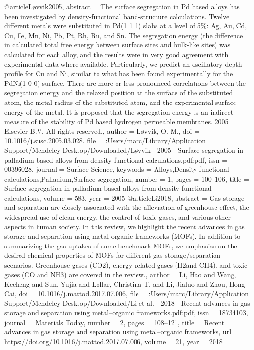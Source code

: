 @article{Løvvik2005,
abstract = {The surface segregation in Pd based alloys has been investigated by density-functional band-structure calculations. Twelve different metals were substituted in Pd(1 1 1) slabs at a level of 5{\%}: Ag, Au, Cd, Cu, Fe, Mn, Ni, Pb, Pt, Rh, Ru, and Sn. The segregation energy (the difference in calculated total free energy between surface sites and bulk-like sites) was calculated for each alloy, and the results were in very good agreement with experimental data where available. Particularly, we predict an oscillatory depth profile for Cu and Ni, similar to what has been found experimentally for the PdNi(1 0 0) surface. There are more or less pronounced correlations between the segregation energy and the relaxed position at the surface of the substituted atom, the metal radius of the substituted atom, and the experimental surface energy of the metal. It is proposed that the segregation energy is an indirect measure of the stability of Pd based hydrogen permeable membranes. {\textcopyright} 2005 Elsevier B.V. All rights reserved.},
author = {L{\o}vvik, O. M.},
doi = {10.1016/j.susc.2005.03.028},
file = {:Users/marc/Library/Application Support/Mendeley Desktop/Downloaded/L{\o}vvik - 2005 - Surface segregation in palladium based alloys from density-functional calculations.pdf:pdf},
issn = {00396028},
journal = {Surface Science},
keywords = {Alloys,Density functional calculations,Palladium,Surface segregation},
number = {1},
pages = {100--106},
title = {{Surface segregation in palladium based alloys from density-functional calculations}},
volume = {583},
year = {2005}
}
@article{Li2018,
abstract = {Gas storage and separation are closely associated with the alleviation of greenhouse effect, the widespread use of clean energy, the control of toxic gases, and various other aspects in human society. In this review, we highlight the recent advances in gas storage and separation using metal-organic frameworks (MOFs). In addition to summarizing the gas uptakes of some benchmark MOFs, we emphasize on the desired chemical properties of MOFs for different gas storage/separation scenarios. Greenhouse gases (CO2), energy-related gases (H2and CH4), and toxic gases (CO and NH3) are covered in the review.},
author = {Li, Hao and Wang, Kecheng and Sun, Yujia and Lollar, Christina T. and Li, Jialuo and Zhou, Hong Cai},
doi = {10.1016/j.mattod.2017.07.006},
file = {:Users/marc/Library/Application Support/Mendeley Desktop/Downloaded/Li et al. - 2018 - Recent advances in gas storage and separation using metal–organic frameworks.pdf:pdf},
issn = {18734103},
journal = {Materials Today},
number = {2},
pages = {108--121},
title = {{Recent advances in gas storage and separation using metal–organic frameworks}},
url = {https://doi.org/10.1016/j.mattod.2017.07.006},
volume = {21},
year = {2018}
}
